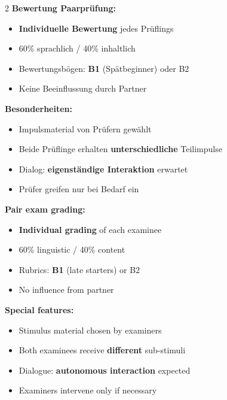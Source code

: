 \documentclass[10pt,a4paper]{article}
\begin{document}
\begin{paracol}{2}
\small
\textbf{Bewertung Paarprüfung:}
\begin{itemize}[noitemsep,topsep=2pt]
\item \textbf{Individuelle Bewertung} jedes Prüflings
\item 60\% sprachlich / 40\% inhaltlich
\item Bewertungsbögen: \textcolor{spaet}{\textbf{B1}} (Spätbeginner) oder B2
\item Keine Beeinflussung durch Partner
\end{itemize}

\textbf{Besonderheiten:}
\begin{itemize}[noitemsep,topsep=2pt]
\item Impulsmaterial von Prüfern gewählt
\item Beide Prüflinge erhalten \textbf{unterschiedliche} Teilimpulse
\item Dialog: \textbf{eigenständige Interaktion} erwartet
\item Prüfer greifen nur bei Bedarf ein
\end{itemize}

\switchcolumn

\small\color{english}
\textbf{Pair exam grading:}
\begin{itemize}[noitemsep,topsep=2pt]
\item \textbf{Individual grading} of each examinee
\item 60\% linguistic / 40\% content
\item Rubrics: \textcolor{spaet}{\textbf{B1}} (late starters) or B2
\item No influence from partner
\end{itemize}

\textbf{Special features:}
\begin{itemize}[noitemsep,topsep=2pt]
\item Stimulus material chosen by examiners
\item Both examinees receive \textbf{different} sub-stimuli
\item Dialogue: \textbf{autonomous interaction} expected
\item Examiners intervene only if necessary
\end{itemize}

\end{paracol}

\end{document}
